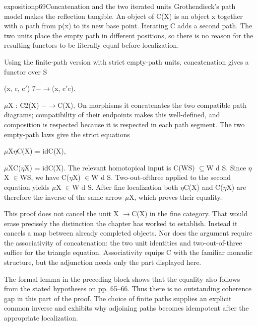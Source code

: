 \begin{dcomment}{exposition}{p69}{Concatenation and the two iterated units}
Grothendieck’s path model makes the reflection tangible. An object of C(X) is an object x together with a path from p(x) to its new base point. Iterating C adds a second path. The two units place the empty path in different positions, so there is no reason for the resulting functors to be literally equal before localization.

Using the finite-path version with strict empty-path units, concatenation gives a functor over S

(x, c, c\ensuremath{\prime}) 7\ensuremath{-}\ensuremath{\to}(x, c\ensuremath{\prime}c).

\ensuremath{\mu}X : C2(X) \ensuremath{-}\ensuremath{\to}C(X), On morphisms it concatenates the two compatible path diagrams; compatibility of their endpoints makes this well-defined, and composition is respected because it is respected in each path segment. The two empty-path laws give the strict equations

\ensuremath{\mu}X\ensuremath{\eta}C(X) = idC(X),

\ensuremath{\mu}XC(\ensuremath{\eta}X) = idC(X). The relevant homotopical input is C(WS) \ensuremath{\subseteq}W d S. Since \ensuremath{\eta}X \ensuremath{\in}WS, we have C(\ensuremath{\eta}X) \ensuremath{\in}W d S. Two-out-ofthree applied to the second equation yields \ensuremath{\mu}X \ensuremath{\in}W d S. After fine localization both \ensuremath{\eta}C(X) and C(\ensuremath{\eta}X) are therefore the inverse of the same arrow \ensuremath{\mu}X, which proves their equality.

This proof does not cancel the unit X \ensuremath{\to}C(X) in the fine category. That would erase precisely the distinction the chapter has worked to establish. Instead it cancels a map between already completed objects. Nor does the argument require the associativity of concatenation: the two unit identities and two-out-of-three suffice for the triangle equation. Associativity equips C with the familiar monadic structure, but the adjunction needs only the part displayed here.

The formal lemma in the preceding block shows that the equality also follows from the stated hypotheses on pp. 65--66. Thus there is no outstanding coherence gap in this part of the proof. The choice of finite paths supplies an explicit common inverse and exhibits why adjoining paths becomes idempotent after the appropriate localization.

\end{dcomment}

